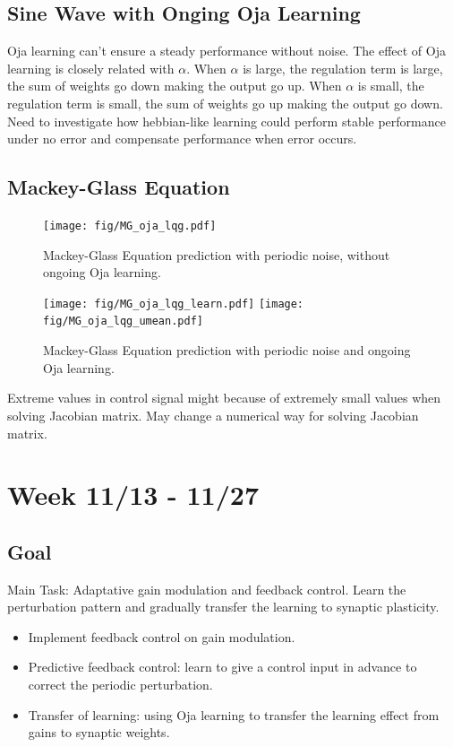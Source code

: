\documentclass[12pt, a4paper]{article}
\begin{document}
\newpage

\subsection*{Sine Wave with Onging Oja Learning}

Oja learning can't ensure a steady performance without noise. The effect of Oja learning is closely related with $\alpha$. When $\alpha$ is large, the regulation term is large, the sum of weights go down making the output go up. When $\alpha$ is small, the regulation term is small, the sum of weights go up making the output go down. Need to investigate how hebbian-like learning could perform stable performance under no error and compensate performance when error occurs.

\newpage

\subsection*{Mackey-Glass Equation}

\begin{figure}[H]
    \centering
    \texttt{[image: fig/MG\_oja\_lqg.pdf]}
    \caption{Mackey-Glass Equation prediction with periodic noise, without ongoing Oja learning.}
    \texttt{[image: fig/MG\_oja\_lqg\_learn.pdf]}
    \texttt{[image: fig/MG\_oja\_lqg\_umean.pdf]}
    \caption{Mackey-Glass Equation prediction with periodic noise and ongoing Oja learning.}
    \label{fig:4}
\end{figure}

Extreme values in control signal might because of extremely small values when solving Jacobian matrix. May change a numerical way for solving Jacobian matrix.

\newpage


\section*{Week 11/13 - 11/27}

\subsection*{Goal}

\noindent
Main Task: Adaptative gain modulation and feedback control. Learn the perturbation pattern and gradually transfer the learning to synaptic plasticity.

\begin{itemize}
    \item Implement feedback control on gain modulation.
    \item Predictive feedback control: learn to give a control input in advance to correct the periodic perturbation.
    \item Transfer of learning: using Oja learning to transfer the learning effect from gains to synaptic weights.
\end{itemize}
\end{document}
